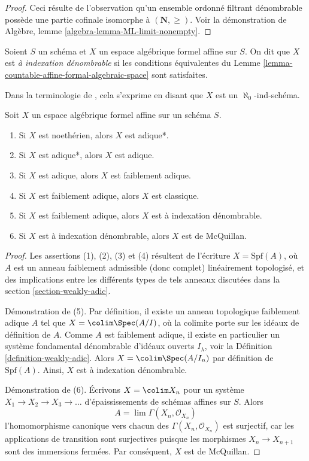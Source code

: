 \begin{proof}
Ceci résulte de l'observation qu'un ensemble ordonné filtrant dénombrable
possède une partie cofinale isomorphe à $(\mathbf{N}, \geq)$.
Voir la démonstration de Algèbre, lemme \ref{algebra-lemma-ML-limit-nonempty}.
\end{proof}

\begin{definition}
\label{definition-countable}
Soient $S$ un schéma et $X$ un espace algébrique formel affine sur $S$.
On dit que $X$ est {\it à indexation dénombrable} si les conditions équivalentes du
Lemme \ref{lemma-countable-affine-formal-algebraic-space} sont satisfaites.
\end{definition}

\noindent
Dans la terminologie de \cite{BVGD}, cela s'exprime en disant que
$X$ est un $\aleph_0$-ind-schéma.

\begin{lemma}
\label{lemma-implications-between-types}
Soit $X$ un espace algébrique formel affine sur un schéma $S$.
\begin{enumerate}
\item Si $X$ est noethérien, alors $X$ est adique*.
\item Si $X$ est adique*, alors $X$ est adique.
\item Si $X$ est adique, alors $X$ est faiblement adique.
\item Si $X$ est faiblement adique, alors $X$ est classique.
\item Si $X$ est faiblement adique, alors $X$ est à indexation dénombrable.
\item Si $X$ est à indexation dénombrable, alors $X$ est de McQuillan.
\end{enumerate}
\end{lemma}

\begin{proof}
Les assertions (1), (2), (3) et (4) résultent de l'écriture $X = \text{Spf}(A)$,
où $A$ est un anneau faiblement admissible (donc complet) linéairement
topologisé, et des implications entre les différents
types de tels anneaux discutées dans la section \ref{section-weakly-adic}.

\medskip\noindent
Démonstration de (5). Par définition, il existe un anneau topologique faiblement adique $A$
tel que $X = \colim \Spec(A/I)$, où la colimite porte sur les idéaux
de définition de $A$. Comme $A$ est faiblement adique, il existe en particulier
un système fondamental dénombrable d'idéaux ouverts $I_\lambda$, voir la
Définition \ref{definition-weakly-adic}.
Alors $X = \colim \Spec(A/I_n)$ par définition de $\text{Spf}(A)$.
Ainsi, $X$ est à indexation dénombrable.

\medskip\noindent
Démonstration de (6). Écrivons $X = \colim X_n$ pour un système
$X_1 \to X_2 \to X_3 \to \ldots$ d'épaississements de schémas
affines sur $S$. Alors
$$
A = \lim \Gamma(X_n, \mathcal{O}_{X_n})
$$
l'homomorphisme canonique vers chacun des $\Gamma(X_n, \mathcal{O}_{X_n})$ est surjectif, car les applications de transition
sont surjectives puisque les morphismes $X_n \to X_{n + 1}$ sont des immersions
fermées. Par conséquent, $X$ est de McQuillan.
\end{proof}

